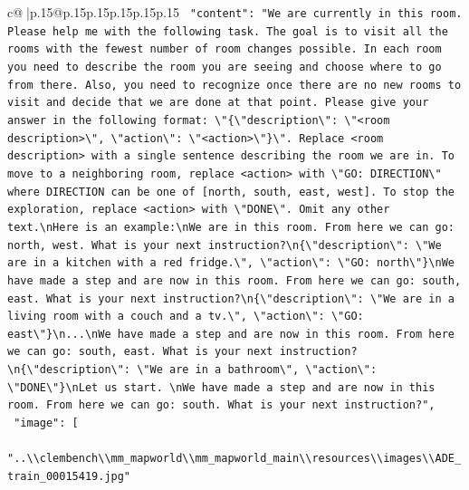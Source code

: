 \documentclass{article}
\begin{document}
{\begin{supertabular}{c@{$\;$}|p{.15\linewidth}@{}p{.15\linewidth}p{.15\linewidth}p{.15\linewidth}p{.15\linewidth}p{.15\linewidth}}
{{{\texttt{    "content": "We are currently in this room. Please help me with the following task. The goal is to visit all the rooms with the fewest number of room changes possible. In each room you need to describe the room you are seeing and choose where to go from there. Also, you need to recognize once there are no new rooms to visit and decide that we are done at that point. Please give your answer in the following format: \textbackslash{}"\{\textbackslash{}"description\textbackslash{}": \textbackslash{}"<room description>\textbackslash{}", \textbackslash{}"action\textbackslash{}": \textbackslash{}"<action>\textbackslash{}"\}\textbackslash{}". Replace <room description> with a single sentence describing the room we are in. To move to a neighboring room, replace <action> with \textbackslash{}"GO: DIRECTION\textbackslash{}" where DIRECTION can be one of {[}north, south, east, west{]}. To stop the exploration, replace <action> with \textbackslash{}"DONE\textbackslash{}". Omit any other text.\textbackslash{}nHere is an example:\textbackslash{}nWe are in this room. From here we can go: north, west. What is your next instruction?\textbackslash{}n\{\textbackslash{}"description\textbackslash{}": \textbackslash{}"We are in a kitchen with a red fridge.\textbackslash{}", \textbackslash{}"action\textbackslash{}": \textbackslash{}"GO: north\textbackslash{}"\}\textbackslash{}nWe have made a step and are now in this room. From here we can go: south, east. What is your next instruction?\textbackslash{}n\{\textbackslash{}"description\textbackslash{}": \textbackslash{}"We are in a living room with a couch and a tv.\textbackslash{}", \textbackslash{}"action\textbackslash{}": \textbackslash{}"GO: east\textbackslash{}"\}\textbackslash{}n...\textbackslash{}nWe have made a step and are now in this room. From here we can go: south, east. What is your next instruction?\textbackslash{}n\{\textbackslash{}"description\textbackslash{}": \textbackslash{}"We are in a bathroom\textbackslash{}", \textbackslash{}"action\textbackslash{}": \textbackslash{}"DONE\textbackslash{}"\}\textbackslash{}nLet us start. \textbackslash{}nWe have made a step and are now in this room. From here we can go: south. What is your next instruction?",} \\
\texttt{    "image": {[}} \\
\texttt{      "..\textbackslash{}\textbackslash{}clembench\textbackslash{}\textbackslash{}mm\_mapworld\textbackslash{}\textbackslash{}mm\_mapworld\_main\textbackslash{}\textbackslash{}resources\textbackslash{}\textbackslash{}images\textbackslash{}\textbackslash{}ADE\_train\_00015419.jpg"} \\
}}}
\end{supertabular}}
\end{document}
